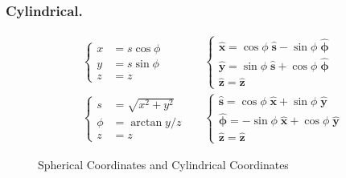 \documentclass[../../../main.tex]{subfiles}
\begin{document}
\subsubsection{Cylindrical.}
\begin{align*}
     & \begin{cases}
           x & = s \cos \phi \\
           y & = s \sin \phi \\
           z & =z
       \end{cases}          &  &
    \begin{cases}
        \mathbf{\hat{x}} =  \cos \phi \;\mathbf{\hat{s}}-  \sin \phi \;\boldsymbol{\hat{\phi}} \\
        \mathbf{\hat{y}} =  \sin \phi \;\mathbf{\hat{s}} + \cos \phi \;\boldsymbol{\hat{\phi}} \\
        \mathbf{\hat{z}} = \mathbf{\hat{z}}
    \end{cases} \\
     & \begin{cases}
           s    & = \sqrt{x^2 + y^2 } \\
           \phi & =\arctan y/z        \\
           z    & = z
       \end{cases} &  &
    \begin{cases}
        \mathbf{\hat{s}} =  \cos \phi \;\mathbf{\hat{x}} +  \sin \phi \;\boldsymbol{\hat{y}}        \\
        \boldsymbol{\hat{\phi}} = -\sin  \phi \;\mathbf{\hat{x}} + \cos \phi \;\boldsymbol{\hat{y}} \\
        \boldsymbol{\hat{z}} = \boldsymbol{\hat{z}}
    \end{cases}
\end{align*}

\begin{figure}
    \centering
    \caption*{Spherical Coordinates and Cylindrical Coordinates}
\end{figure}
\end{document}
